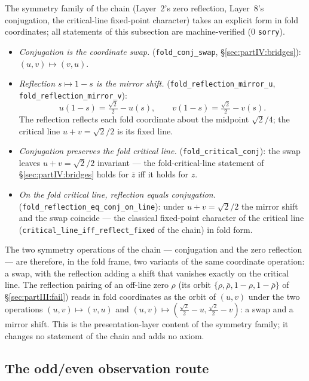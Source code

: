 \documentclass{article}
\begin{document}
The symmetry family of the chain (Layer~2's zero reflection, Layer~8's
conjugation, the critical-line fixed-point character) takes an explicit
form in fold coordinates; all statements of this subsection are
machine-verified (0 \texttt{sorry}).
\begin{itemize}
\item \emph{Conjugation is the coordinate swap.}
  (\texttt{fold\_conj\_swap}, \S\ref{sec:partIV:bridges}):
  $(u,v)\mapsto(v,u)$.
\item \emph{Reflection $s\mapsto 1-s$ is the mirror shift.}
  (\texttt{fold\_reflection\_mirror\_u}, \texttt{fold\_reflection\_mirror\_v}):
  \begin{equation}
    u(1-s)=\tfrac{\sqrt2}{2}-u(s),\qquad
    v(1-s)=\tfrac{\sqrt2}{2}-v(s).
  \end{equation}
  The reflection reflects each fold coordinate about the midpoint
  $\sqrt2/4$; the critical line $u+v=\sqrt2/2$ is its fixed line.
\item \emph{Conjugation preserves the fold critical line.}
  (\texttt{fold\_critical\_conj}): the swap leaves $u+v=\sqrt2/2$
  invariant --- the fold-critical-line statement of
  \S\ref{sec:partIV:bridges} holds for $\bar z$ iff it holds for $z$.
\item \emph{On the fold critical line, reflection equals conjugation.}
  (\texttt{fold\_reflection\_eq\_conj\_on\_line}): under
  $u+v=\sqrt2/2$ the mirror shift and the swap coincide --- the
  classical fixed-point character of the critical line
  (\texttt{critical\_line\_iff\_reflect\_fixed} of the chain) in fold
  form.
\end{itemize}
The two symmetry operations of the chain --- conjugation and the zero
reflection --- are therefore, in the fold frame, two variants of the
same coordinate operation: a swap, with the reflection adding a shift
that vanishes exactly on the critical line. The reflection pairing of
an off-line zero $\rho$ (its orbit
$\{\rho,\bar\rho,1-\rho,1-\bar\rho\}$ of \S\ref{sec:partIII:fail})
reads in fold coordinates as the orbit of $(u,v)$ under the two
operations
$(u,v)\mapsto(v,u)$ and $(u,v)\mapsto(\tfrac{\sqrt2}{2}-u,\tfrac{\sqrt2}{2}-v)$:
a swap and a mirror shift. This is the presentation-layer content of
the symmetry family; it changes no statement of the chain and adds no
axiom.

\subsection{The odd/even observation route}
\label{sec:partIV:route}
\end{document}
